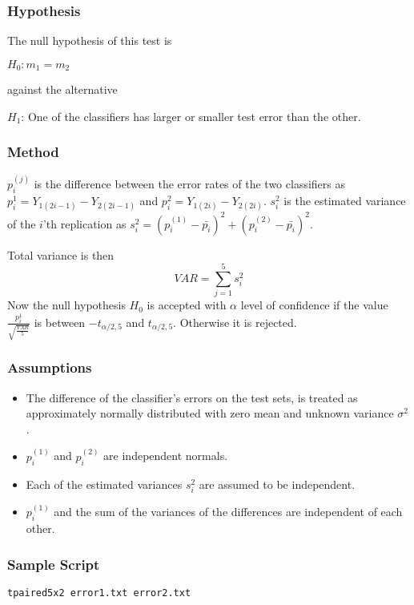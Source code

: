 \documentclass[a4paper,12pt]{book}
\begin{document}
\subsubsection{Hypothesis}
The null hypothesis of this test is
\begin{center}
$H_0: m_1=m_2$
\end{center}
against the alternative
\begin{center}
$H_1$: One of the classifiers has larger or smaller test error than the other.
\end{center}

\subsubsection{Method}
$p_i^{(j)}$ is the difference between the error rates of the two classifiers as
$p_i^{1}=Y_{1(2i-1)}-Y_{2(2i-1)}$ and $p_i^{2}=Y_{1(2i)}-Y_{2(2i)}$. $s_i^2$ is the estimated
variance of the $i$'th replication as $s_i^2=(p_i^{(1)}-\bar{p_i})^2+(p_i^{(2)}-\bar{p_i})^2$.

Total variance is then 
\begin{equation}
VAR=\sum_{j=1}^5s_i^2
\end{equation}
Now the null hypothesis $H_0$ is accepted with $\alpha$ level of confidence if the value $\frac{p_i^{1}}{\sqrt{\frac{VAR}{5}}}$ is between $-t_{\alpha / 2, 5}$ and $t_{\alpha / 2, 5}$. Otherwise it is rejected.

\subsubsection{Assumptions}
\begin{itemize}
\item The difference of the classifier's errors on the test sets, is treated as approximately normally distributed
with zero mean and unknown variance $\sigma^2$.
\item $p_i^{(1)}$ and $p_i^{(2)}$ are independent normals.
\item Each of the estimated variances $s_i^2$ are assumed to be independent.
\item $p_i^{(1)}$ and the sum of the variances of the differences are independent of each other. 
\end{itemize}

\subsubsection{Sample Script}
\begin{verbatim}
tpaired5x2 error1.txt error2.txt
\end{verbatim}
\end{document}

